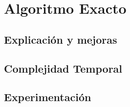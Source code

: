 \section{Algoritmo Exacto}

\subsection{Explicaci\'on y mejoras}
\subsection{Complejidad Temporal}
\subsection{Experimentaci\'on}
